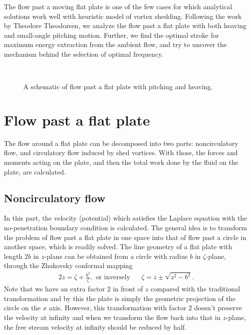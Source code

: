 
The flow past a moving flat plate is one of the few cases for which analytical solutions work well with heuristic model of vortex shedding.
Following the work by Theodore Theodorsen, we analyze the flow past a flat plate with both heaving and small-angle pitching motion. 
Further, we find the optimal stroke for maximum energy extraction from the ambient flow, and try to uncover the mechanism behind the selection of optimal frequency. 

\begin{figure}
 \centering
 \noindent \\
 
\caption{A schematic of flow past a flat plate with pitching and heaving.}
\label{fig:FlatPlate}
\end{figure}


\section{Flow past a flat plate}

The flow around a flat plate can be decomposed into two parts: noncirculatory flow, and circulatory flow induced by shed vortices.
With those, the forces and moments acting on the plate, and then the total work done by the fluid on the plate, are calculated.

\subsection{Noncirculatory flow}

In this part, the velocity (potential) which satisfies the Laplace equation with the no-penetration boundary condition is calculated.
The general idea is to transform the problem of flow past a flat plate in one space into that of flow past a circle in another space, which is readily solved. 
The line geometry of a flat plate with length $2b$ in $z$-plane can be obtained from a circle with radius $b$ in $\zeta$-plane, through the Zhukovsky conformal mapping
\begin{align} \label{eqn:ConformalMapping}
2z = \zeta + \frac{b^2}{\zeta},    \text{   or inversely~~~~~}   \zeta =z \pm \sqrt{z^2-b^2}.
\end{align}
Note that we have an extra factor $2$ in front of $z$ compared with the traditional transformation and by this the plate is simply the geometric projection of the circle on the  $x$ axis.
However, this transformation with factor $2$ doesn't preserve the velocity at infinity and when we transform the flow back into that in $z$-plane, the free stream velocity at infinity should be reduced by half.


